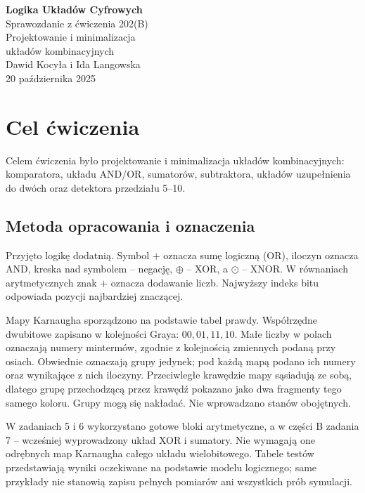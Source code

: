\documentclass[12pt,a4paper]{article}
\begin{document}
\hypersetup{pageanchor=false}
\begin{titlepage}
\centering
\vspace*{0.15\textheight}
{\LARGE \textbf{Logika Układów Cyfrowych}\\[0.7cm]}
{\Large Sprawozdanie z ćwiczenia 202(B)\\[0.5cm]}
{\large Projektowanie i minimalizacja\\układów kombinacyjnych\\[1.5cm]}
{\Large Dawid Kocyła i Ida Langowska\\[0.7cm]}
{\large 20 października 2025}
\end{titlepage}
\hypersetup{pageanchor=true}
\setcounter{tocdepth}{1}
\tableofcontents
\newpage
\section{Cel ćwiczenia}
Celem ćwiczenia było projektowanie i minimalizacja układów kombinacyjnych: komparatora, układu AND/OR, sumatorów, subtraktora, układów uzupełnienia do dwóch oraz detektora przedziału 5--10.

\subsection{Metoda opracowania i oznaczenia}
Przyjęto logikę dodatnią. Symbol $+$ oznacza sumę logiczną (OR),
iloczyn oznacza AND, kreska nad symbolem -- negację, $\oplus$ -- XOR,
a $\odot$ -- XNOR. W równaniach arytmetycznych znak $+$ oznacza dodawanie liczb.
Najwyższy indeks bitu odpowiada pozycji najbardziej znaczącej.

Mapy Karnaugha sporządzono na podstawie tabel prawdy. Współrzędne
dwubitowe zapisano w kolejności Graya: $00,01,11,10$.
Małe liczby w polach oznaczają numery mintermów, zgodnie z kolejnością
zmiennych podaną przy osiach. Obwiednie oznaczają grupy jedynek;
pod każdą mapą podano ich numery oraz wynikające z nich iloczyny.
Przeciwległe krawędzie mapy sąsiadują ze sobą, dlatego grupę przechodzącą
przez krawędź pokazano jako dwa fragmenty tego samego koloru.
Grupy mogą się nakładać. Nie wprowadzano stanów obojętnych.

W zadaniach 5 i 6 wykorzystano gotowe bloki arytmetyczne, a w części B
zadania 7 -- wcześniej wyprowadzony układ XOR i sumatory. Nie wymagają one
odrębnych map Karnaugha całego układu wielobitowego.
Tabele testów przedstawiają wyniki oczekiwane na podstawie modelu logicznego;
same przykłady nie stanowią zapisu pełnych pomiarów ani wszystkich prób symulacji.
\end{document}
